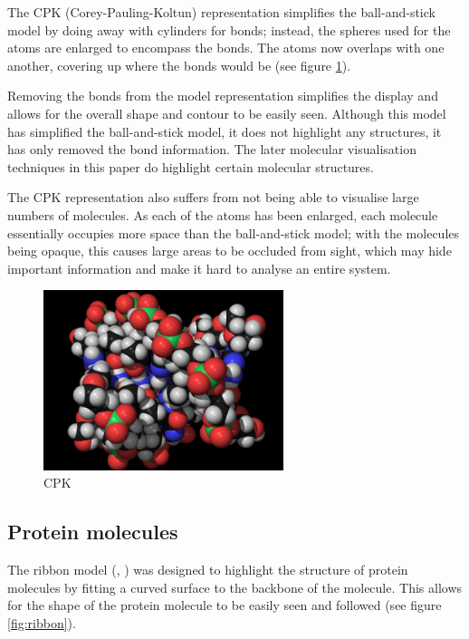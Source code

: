 The CPK (Corey-Pauling-Koltun) \citep{corey53} representation simplifies the
ball-and-stick model by doing away with cylinders for bonds; instead, the
spheres used for the atoms are enlarged to encompass the bonds. The atoms now
overlaps with one another, covering up where the bonds would be (see figure
\ref{fig:cpk}).

Removing the bonds from the model representation simplifies the display and
allows for the overall shape and contour to be easily seen. Although this model
has simplified the ball-and-stick model, it does not highlight any structures,
it has only removed the bond information. The later molecular visualisation
techniques in this paper do highlight certain molecular structures.

The CPK representation also suffers from not being able to visualise large
numbers of molecules. As each of the atoms has been enlarged, each molecule
essentially occupies more space than the ball-and-stick model; with the
molecules being opaque, this causes large areas to be occluded from sight, which
may hide important information and make it hard to analyse an entire system.

\begin{figure}[h!]
  \begin{center}
    \includegraphics[width=70mm]{CPK-big}
  \end{center}
  \caption{CPK}
  \label{fig:cpk}
\end{figure}


\subsection{Protein molecules}
\label{sub:protein}

The ribbon model (\citep{richardson81}, \citep{carson87}) was designed to
highlight the structure of protein molecules by fitting a curved surface to the
backbone of the molecule. This allows for the shape of the protein molecule to
be easily seen and followed (see figure \ref{fig:ribbon}).

